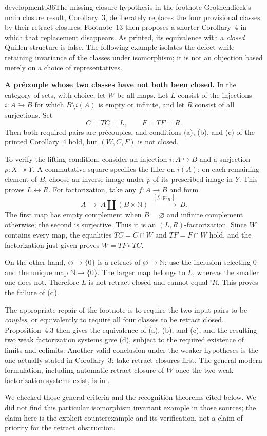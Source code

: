 \begin{dcomment}{development}{p36}{The missing closure hypothesis in the footnote}
Grothendieck's main closure result, Corollary~3, deliberately replaces the four provisional classes by their retract closures. Footnote~13 then proposes a shorter Corollary~4 in which that replacement disappears. As printed, its equivalence with a \emph{closed} Quillen structure is false. The following example isolates the defect while retaining invariance of the classes under isomorphism; it is not an objection based merely on a choice of representatives.

\textbf{A pr\'ecouple whose two classes have not both been closed.}\ours
In the category of sets, with choice, let $W$ be all maps. Let $L$ consist of the injections $i:A\hookrightarrow B$ for which $B\setminus i(A)$ is empty or infinite, and let $R$ consist of all surjections. Set
\[
C=TC=L,\qquad F=TF=R.
\]
Then both required pairs are pr\'ecouples, and conditions (a), (b), and (c) of the printed Corollary~4 hold, but $(W,C,F)$ is not closed.

To verify the lifting condition, consider an injection $i:A\hookrightarrow B$ and a surjection $p:X\twoheadrightarrow Y$. A commutative square specifies the filler on $i(A)$; on each remaining element of $B$, choose an inverse image under $p$ of its prescribed image in $Y$. This proves $L\longleftrightarrow R$. For factorization, take any $f:A\to B$ and form
\[
A\ \longrightarrow\ A\amalg(B\times\mathbb N)
  \ \xrightarrow{\ [f,\operatorname{pr}_B]\ }\ B.
\]
The first map has empty complement when $B=\varnothing$ and infinite complement otherwise; the second is surjective. Thus it is an $(L,R)$-factorization. Since $W$ contains every map, the equalities $TC=C\cap W$ and $TF=F\cap W$ hold, and the factorization just given proves $W=TF\circ TC$.

On the other hand, $\varnothing\to\{0\}$ is a retract of $\varnothing\to\mathbb N$: use the inclusion selecting $0$ and the unique map $\mathbb N\to\{0\}$. The larger map belongs to $L$, whereas the smaller one does not. Therefore $L$ is not retract closed and cannot equal ${}^{\square}R$. This proves the failure of (d).

The appropriate repair of the footnote is to require the two input pairs to be \emph{couples}, or equivalently to require all four classes to be retract closed. Proposition~4.3 then gives the equivalence of (a), (b), and (c), and the resulting two weak factorization systems give (d), subject to the required existence of limits and colimits. Another valid conclusion under the weaker hypotheses is the one actually stated in Corollary~3: take retract closures first. The general modern formulation, including automatic retract closure of $W$ once the two weak factorization systems exist, is in \citet[Definition~11.3.1 and Lemma~11.3.3]{Riehl2014}.

We checked those general criteria and the recognition theorems cited below. We did not find this particular isomorphism invariant example in those sources; the claim here is the explicit counterexample and its verification, not a claim of priority for the retract obstruction.
\end{dcomment}

